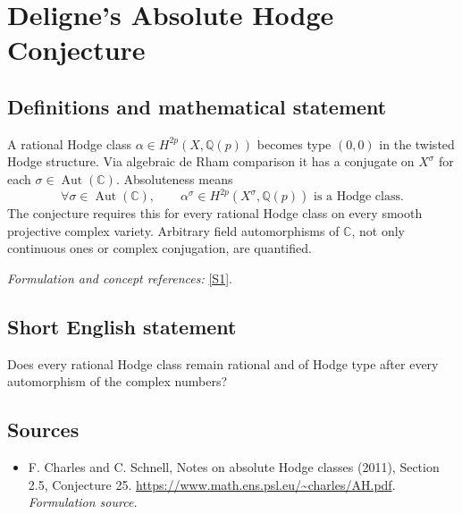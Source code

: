 \documentclass[11pt]{article}
\begin{document}
\section*{\texorpdfstring{Deligne's Absolute Hodge Conjecture}{Deligne's Absolute Hodge Conjecture}}\label{94}
\subsection{Definitions and mathematical statement}
A rational Hodge class $\alpha\in H^{2p}(X,{\mathbb{Q}}(p))$ becomes type $(0,0)$ in the twisted Hodge structure. Via algebraic de Rham comparison it has a conjugate on $X^\sigma$ for each $\sigma\in\operatorname{Aut}({\mathbb{C}})$. Absoluteness means
\[
 \forall\sigma\in\operatorname{Aut}({\mathbb{C}}),\qquad
 \alpha^\sigma\in H^{2p}(X^\sigma,{\mathbb{Q}}(p))\text{ is a Hodge class}.
\]
The conjecture requires this for every rational Hodge class on every smooth projective complex variety. Arbitrary field automorphisms of ${\mathbb{C}}$, not only continuous ones or complex conjugation, are quantified.
\par\smallskip\textit{Formulation and concept references:} \href{https://www.math.ens.psl.eu/~charles/AH.pdf}{[S1]}.

\subsection{Short English statement}
Does every rational Hodge class remain rational and of Hodge type after every automorphism of the complex numbers?
\subsection{Sources}
\begin{itemize}
\item[S1]F. Charles and C. Schnell, Notes on absolute Hodge classes (2011), Section 2.5, Conjecture 25.
\url{https://www.math.ens.psl.eu/~charles/AH.pdf}.
\textit{Formulation source.}
\end{itemize}
\end{document}
